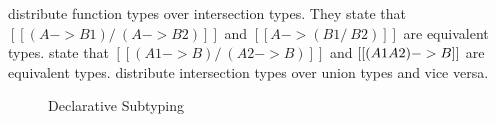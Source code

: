   distribute function types over intersection types.
They state that $[[(A -> B1) /\ (A -> B2)]]$ and $[[A -> (B1 /\ B2)]]$ are equivalent types.
 state that $[[(A1 -> B) /\ (A2 -> B)]]$ and $[[(A1 \/ A2) -> B]]$
are equivalent types.
 distribute intersection types over union types and vice versa.


\begin{figure}[t]
  \caption{Declarative Subtyping}
  \label{fig:discussion:ds}
\end{figure}
